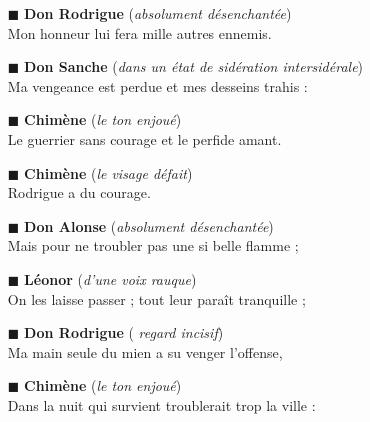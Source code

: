 \documentclass{article}
\begin{document}
	\begin{itemize}
		\item[$\blacksquare$] \textbf{Don Rodrigue} (\emph{absolument désenchantée}) \\
		\textsf{Mon honneur lui fera mille autres ennemis.}
		\item[$\blacksquare$] \textbf{Don Sanche} (\emph{dans un état de sidération intersidérale}) \\
		\textsf{Ma vengeance est perdue et mes desseins trahis :}
		\item[$\blacksquare$] \textbf{Chimène} (\emph{le ton enjoué}) \\
		\textsf{Le guerrier sans courage et le perfide amant.}
		\item[$\blacksquare$] \textbf{Chimène} (\emph{le visage défait}) \\
		\textsf{Rodrigue a du courage.}
		\item[$\blacksquare$] \textbf{Don Alonse} (\emph{absolument désenchantée}) \\
		\textsf{Mais pour ne troubler pas une si belle flamme ;}
		\item[$\blacksquare$] \textbf{Léonor} (\emph{d’une voix rauque}) \\
		\textsf{On les laisse passer ; tout leur paraît tranquille ;}
		\item[$\blacksquare$] \textbf{Don Rodrigue} (\emph{ regard incisif}) \\
		\textsf{Ma main seule du mien a su venger l’offense,}
		\item[$\blacksquare$] \textbf{Chimène} (\emph{le ton enjoué}) \\
		\textsf{Dans la nuit qui survient troublerait trop la ville :}
	\end{itemize}
	
\end{document}
